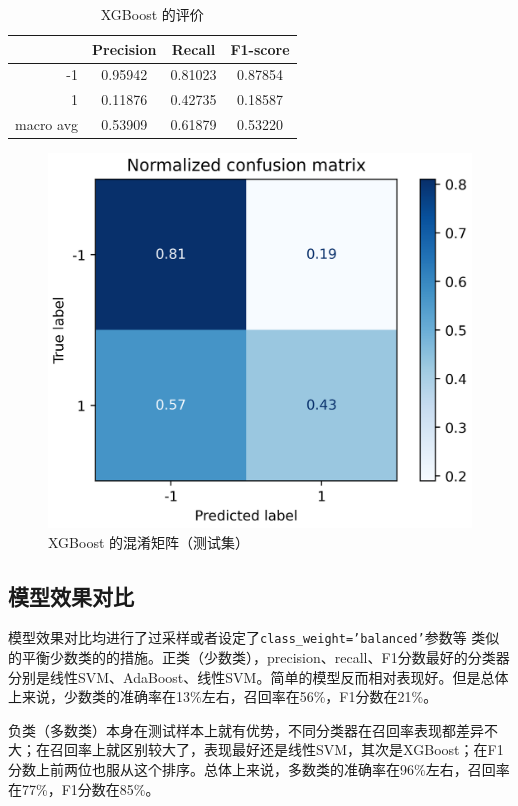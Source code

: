 \documentclass[a4paper]{article}
\begin{document}
\begin{table}[!h]
    \centering
    \renewcommand{\arraystretch}{1.5}
    \begin{tabular}{|r|c|c|c|}
        \hline
                  & Precision & Recall & F1-score \\ \hline
        -1        &     0.95942     &     0.81023   &    0.87854      \\ \hline
        1         &     0.11876      &     0.42735   &   0.18587       \\ \hline
        macro avg &      0.53909     &     0.61879   &    0.53220      \\ \hline
    \end{tabular}
    \caption{XGBoost 的评价}
    \label{tb:xgb}
\end{table}

\begin{figure}[!h]
    \centering
    \includegraphics[width=0.48\linewidth]{xgboost_confus_mat-norm.png}
    \caption{XGBoost 的混淆矩阵（测试集）}
    \label{fig:result:xgb}
\end{figure}


\subsection{模型效果对比}

模型效果对比均进行了过采样或者设定了\texttt{class\_weight='balanced'}参数等 类似的平衡少数类的的措施。正类（少数类），precision、recall、F1分数最好的分类器分别是线性SVM、AdaBoost、线性SVM。简单的模型反而相对表现好。但是总体上来说，少数类的准确率在13\%左右，召回率在56\%，F1分数在21\%。

负类（多数类）本身在测试样本上就有优势，不同分类器在召回率表现都差异不大；在召回率上就区别较大了，表现最好还是线性SVM，其次是XGBoost；在F1分数上前两位也服从这个排序。总体上来说，多数类的准确率在96\%左右，召回率在77\%，F1分数在85\%。
\end{document}
